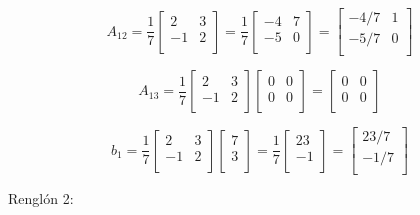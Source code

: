 \documentclass{article}
\begin{document}
$$A_{12} =\frac{1}{7}
\begin{bmatrix}
    2 & 3 \\
    -1 & 2 \\
\end{bmatrix} = \frac{1}{7}
\begin{bmatrix}
    -4 & 7 \\
    -5 & 0 \\
\end{bmatrix} = \begin{bmatrix}
    -4/7 & 1 \\
    -5/7 & 0 \\
\end{bmatrix}$$

$$A_{13}= \frac{1}{7}
\begin{bmatrix}
    2 & 3 \\
    -1 & 2 \\
\end{bmatrix} \begin{bmatrix}
    0 & 0 \\
    0 & 0 \\
\end{bmatrix} = \begin{bmatrix}
    0 & 0 \\
    0 & 0 \\
\end{bmatrix}$$

$$b_1 = \frac{1}{7}
\begin{bmatrix}
    2 & 3 \\
    -1 & 2 \\
\end{bmatrix} \begin{bmatrix}
    7 \\ 
    3 \\
\end{bmatrix} = \frac{1}{7} \begin{bmatrix}
    23 \\
    -1 \\ 
\end{bmatrix} = \begin{bmatrix}
    23/7 \\
    -1/7 \\
\end{bmatrix}$$

Renglón 2:
\end{document}
